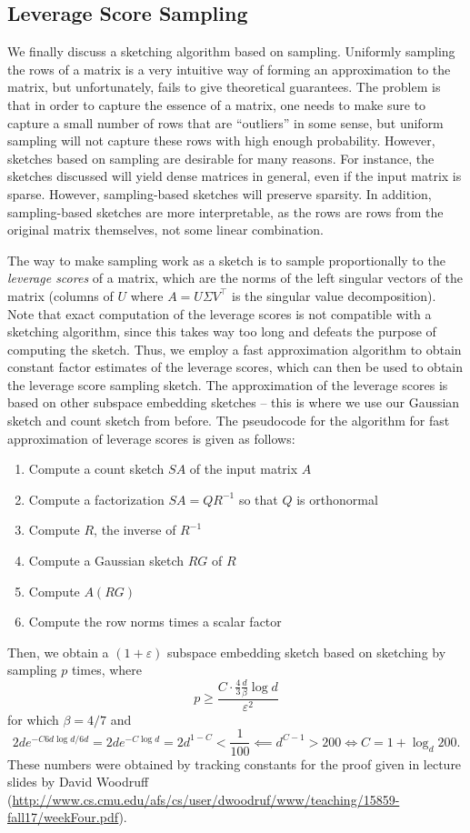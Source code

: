 \documentclass[12pt]{article}
\begin{document}
\subsection{Leverage Score Sampling}
We finally discuss a sketching algorithm based on sampling. Uniformly sampling the rows of a matrix is a very intuitive way of forming an approximation to the matrix, but unfortunately, fails to give theoretical guarantees. The problem is that in order to capture the essence of a matrix, one needs to make sure to capture a small number of rows that are ``outliers'' in some sense, but uniform sampling will not capture these rows with high enough probability. However, sketches based on sampling are desirable for many reasons. For instance, the sketches discussed will yield dense matrices in general, even if the input matrix is sparse. However, sampling-based sketches will preserve sparsity. In addition, sampling-based sketches are more interpretable, as the rows are rows from the original matrix themselves, not some linear combination. 

The way to make sampling work as a sketch is to sample proportionally to the \emph{leverage scores} of a matrix, which are the norms of the left singular vectors of the matrix (columns of $U$ where $A = U\Sigma V^\top$ is the singular value decomposition). Note that exact computation of the leverage scores is not compatible with a sketching algorithm, since this takes way too long and defeats the purpose of computing the sketch. Thus, we employ a fast approximation algorithm to obtain constant factor estimates of the leverage scores, which can then be used to obtain the leverage score sampling sketch. The approximation of the leverage scores is based on other subspace embedding sketches -- this is where we use our Gaussian sketch and count sketch from before. The pseudocode for the algorithm for fast approximation of leverage scores is given as follows:
\begin{enumerate}
	\item Compute a count sketch $SA$ of the input matrix $A$
	\item Compute a factorization $SA = QR^{-1}$ so that $Q$ is orthonormal
	\item Compute $R$, the inverse of $R^{-1}$
	\item Compute a Gaussian sketch $RG$ of $R$
	\item Compute $A(RG)$
	\item Compute the row norms times a scalar factor
\end{enumerate}
Then, we obtain a $(1+\varepsilon)$ subspace embedding sketch based on sketching by sampling $p$ times, where
\[
	p\geq \frac{C\cdot \frac43\frac{d}{\beta}\log d}{\varepsilon^2}
\]
for which $\beta = 4/7$ and 
\[
	2de^{-C6d\log d/6d} = 2de^{-C\log d} = 2d^{1-C}<\frac1{100}\impliedby d^{C-1}>200\iff C = 1 + \log_d 200.
\]
These numbers were obtained by tracking constants for the proof given in lecture slides by David Woodruff (\url{http://www.cs.cmu.edu/afs/cs/user/dwoodruf/www/teaching/15859-fall17/weekFour.pdf}). 
\end{document}
